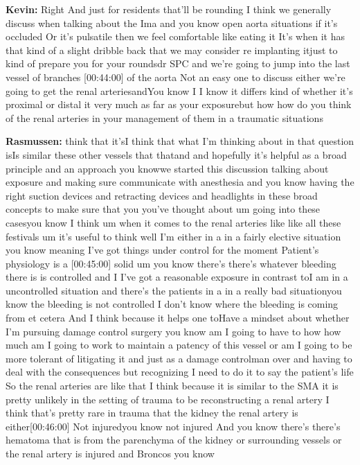 \documentclass[
]{book}
\begin{document}
\textbf{Kevin:} Right And just for residents that'll be rounding I think we
generally discuss when talking about the Ima and you know open aorta
situations if it's occluded Or it's pulsatile then we feel comfortable
like eating it It's when it has that kind of a slight dribble back that
we may consider re implanting itjust to kind of prepare you for your
roundsdr SPC and we're going to jump into the last vessel of branches
{[}00:44:00{]} of the aorta Not an easy one to discuss either we're going to
get the renal arteriesandYou know I I know it differs kind of whether
it's proximal or distal it very much as far as your exposurebut how how
do you think of the renal arteries in your management of them in a
traumatic situations

\textbf{Rasmussen:} think that it'sI think that what I'm thinking about in
that question isIs similar these other vessels that thatand and
hopefully it's helpful as a broad principle and an approach you knowwe
started this discussion talking about exposure and making sure
communicate with anesthesia and you know having the right suction
devices and retracting devices and headlights in these broad concepts to
make sure that you you've thought about um going into these casesyou
know I think um when it comes to the renal arteries like like all these
festivals um it's useful to think well I'm either in a in a fairly
elective situation you know meaning I've got things under control for
the moment Patient's physiology is a {[}00:45:00{]} solid um you know
there's there's whatever bleeding there is is controlled and I I've got
a reasonable exposure in contrast toI am in a uncontrolled situation and
there's the patients in a in a really bad situationyou know the bleeding
is not controlled I don't know where the bleeding is coming from et
cetera And I think because it helps one toHave a mindset about whether
I'm pursuing damage control surgery you know am I going to have to how
how much am I going to work to maintain a patency of this vessel or am I
going to be more tolerant of litigating it and just as a damage
controlman over and having to deal with the consequences but recognizing
I need to do it to say the patient's life So the renal arteries are like
that I think because it is similar to the SMA it is pretty unlikely in
the setting of trauma to be reconstructing a renal artery I think that's
pretty rare in trauma that the kidney the renal artery is
either{[}00:46:00{]} Not injuredyou know not injured And you know there's
there's hematoma that is from the parenchyma of the kidney or
surrounding vessels or the renal artery is injured and Broncos you know
\end{document}

